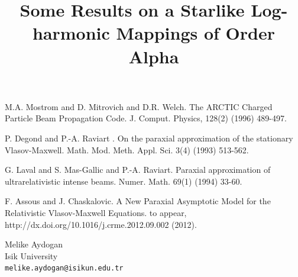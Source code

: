 \documentclass[article, A4, 11pt]{llncs}%
\begin{document}

\begin{thebibliography}{10}
{\sc M.A. Mostrom and D. Mitrovich and D.R. Welch}. {The ARCTIC Charged Particle Beam Propagation Code}. J. Comput. Physics, 128(2) (1996) 489-497.

{\sc P. Degond and P.-A. Raviart }. {On the paraxial approximation of the stationary Vlasov-Maxwell}.  Math. Mod. Meth. Appl. Sci. 3(4) (1993) 513-562.

{\sc G. Laval and S. Mas-Gallic and P.-A. Raviart}. {Paraxial approximation of ultrarelativistic intense beams}. Numer. Math. 69(1) (1994) 33-60.

{\sc F. Assous and J. Chaskalovic}. {A New Paraxial Asymptotic Model for the Relativistic Vlasov-Maxwell Equations}. to appear, http://dx.doi.org/10.1016/j.crme.2012.09.002 (2012).
\end{thebibliography} %

\title{Some  Results on a Starlike  Log-harmonic Mappings of Order Alpha}
 \author{} \institute{}
\maketitle
\begin{center}
{\large Melike  Aydogan}\\
Isik University\\
{\tt melike.aydogan@isikun.edu.tr}
\end{center}
\end{document}
